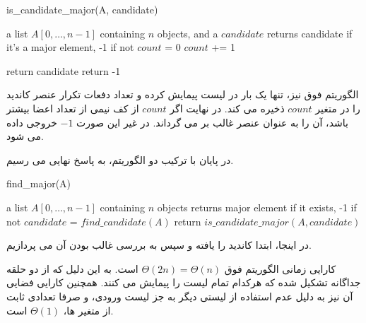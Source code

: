 \documentclass{article}
\begin{document}
\begin{latin}
    \begin{algorithm}[H]
        \caption*{is\_candidate\_major(A, candidate)}
        \begin{algorithmic}
            \Require a list $A[0, \ldots, n-1]$ containing $n$ objects, and a $candidate$
            \Ensure returns candidate if it's a major element, -1 if not
            \State $count$ = 0
                    \State $count$ += 1
                \EndIf
            \EndFor

                \State return candidate
            \Else
                \State return -1
            \EndIf
        \end{algorithmic}
    \end{algorithm}
\end{latin}


الگوریتم فوق نیز، تنها یک بار در لیست پیمایش کرده و تعداد دفعات تکرار عنصر کاندید
را در متغیر
$count$
ذخیره می کند.
در نهایت اگر
$count$
از کف نیمی از تعداد اعضا بیشتر باشد، آن را به عنوان عنصر غالب بر می گرداند.
در غیر این صورت 
$-1$
خروجی داده می شود.

در پایان با ترکیب دو الگوریتم، به پاسخ نهایی می رسیم.

\begin{latin}
    \begin{algorithm}[H]
        \caption*{find\_major(A)}
        \begin{algorithmic}
            \Require a list $A[0, \ldots, n-1]$ containing $n$ objects
            \Ensure returns major element if it exists, -1 if not
            \State $candidate$ = $find\_candidate(A)$
            \State return $is\_candidate\_major(A, candidate)$
        \end{algorithmic}
    \end{algorithm}
\end{latin}

در اینجا، ابتدا کاندید را یافته و سپس به بررسی غالب بودن آن می پردازیم.

کارایی زمانی الگوریتم فوق
$\Theta(2n) = \Theta(n)$
است.
به این دلیل که از دو حلقه جداگانه تشکیل شده که هرکدام تمام لیست را پیمایش می کنند.
همچنین کارایی فضایی آن نیز به دلیل عدم استفاده از لیستی دیگر به جز لیست ورودی،
و صرفا تعدادی ثابت از متغیر ها، 
$\Theta(1)$
است.
\end{document}
